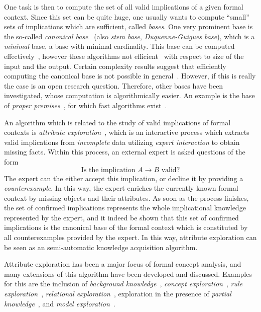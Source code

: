 One task is then to compute the set of all valid implications of a given formal context.
Since this set can be quite huge, one usually wants to compute \enquote{small} sets of
implications which are sufficient, called \emph{bases}.  One very prominent base is the
so-called \emph{canonical base}~\cite{fca:DuquenneGuigues:1986} (also \emph{stem base},
\emph{Duquenne-Guigues base}), which is a \emph{minimal} base, \ie a base with minimal
cardinality.  This base can be computed
effectively~\cite{DBLP:conf/icfca/Ganter10,DBLP:journals/amai/ObiedkovD07}, however these
algorithms not efficient~\cite{DBLP:conf/icfca/Distel10} with respect to size of the input
and the output.  Certain complexity results suggest that efficiently computing the
canonical base is not possible in general~\cite{DBLP:journals/dam/BabinK13}.  However, if
this is really the case is an open research question.  Therefore, other bases have been
investigated, whose computation is algorithmically easier.  An example is the base of
\emph{proper premises}~\cite{fca-book}, for which fast algorithms
exist~\cite{RyDiBo-AMAI13}.

An algorithm which is related to the study of valid implications of formal contexts is
\emph{attribute exploration}~\cite{fca-book,GORS-book}, which is an interactive process
which extracts valid implications from \emph{incomplete} data utilizing \emph{expert
  interaction} to obtain missing facts.  Within this process, an external expert is asked
questions of the form
\begin{equation*}
  \text{Is the implication } A \to B \text{ valid?}
\end{equation*}
The expert can the either accept this implication, or decline it by providing a
\emph{counterexample}.  In this way, the expert enriches the currently known formal
context by missing objects and their attributes.  As soon as the process finishes, the set
of confirmed implications represents the whole implicational knowledge represented by the
expert, and it indeed be shown that this set of confirmed implications is the canonical
base of the formal context which is constituted by all counterexamples provided by the
expert.  In this way, attribute exploration can be seen as an semi-automatic knowledge
acquisition algorithm.

Attribute exploration has been a major focus of formal concept analysis, and many
extensions of this algorithm have been developed and discussed.  Examples for this are the
inclusion of \emph{background
  knowledge}~\cite{stumme96attribute,DBLP:journals/tcs/Ganter99}, \emph{concept
  exploration}~\cite{conf/iccs/Stumme97}, \emph{rule
  exploration}~\cite{phd/de/Zickwolff1991}, \emph{relational
  exploration}~\cite{phd/de/Rudolph2006}, exploration in the presence of \emph{partial
  knowledge}~\cite{book/fca/BurmeisterH05,conf/ijcai/BaaderGSS07}, and \emph{model
  exploration}~\cite{Diss-Felix}.

